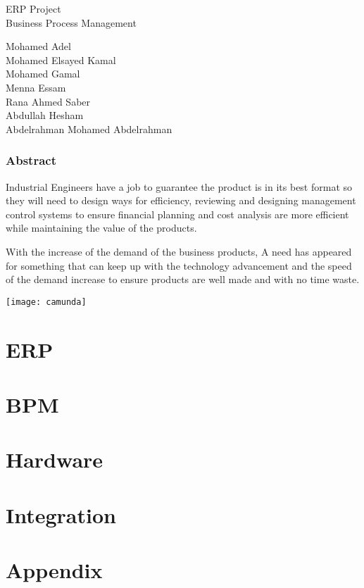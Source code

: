 \documentclass[12pt,letterpaper,oneside,openany]{book}
\begin{document}
    \begin{center}
  
        \LARGE ERP Project\\
        \Large Business Process Management

    \end{center}

    \vspace*{\fill}
        \begingroup
        \centering

            \Large Mohamed Adel\\
            \Large Mohamed Elsayed Kamal\\
            \Large Mohamed Gamal\\
            \Large Menna Essam\\
            \Large Rana Ahmed Saber\\
            \Large Abdullah Hesham\\
            \Large Abdelrahman Mohamed Abdelrahman\\
        
        \endgroup
    \vspace*{\fill}

   \newpage

   
   \section{Abstract}
   \large Industrial Engineers have a job to guarantee the product is in its best format so they will need to design ways for efficiency, reviewing and designing management control systems to ensure financial planning and cost analysis are more efficient while maintaining the value of the products.

   With the increase of the demand of the business products, A need has appeared for something that can keep up with the technology advancement and the speed of the demand increase to ensure products are well made and with no time waste. 
   

   \newpage

   \listoffigures

   \newpage

   \texttt{[image: camunda]}

   \newpage
    \tableofcontents

    \newpage


    \part{ERP}
    

    \part{BPM}
    

    \part{Hardware}
    

    \part{Integration}
    
    
    \part{Appendix}
    
\end{document}
